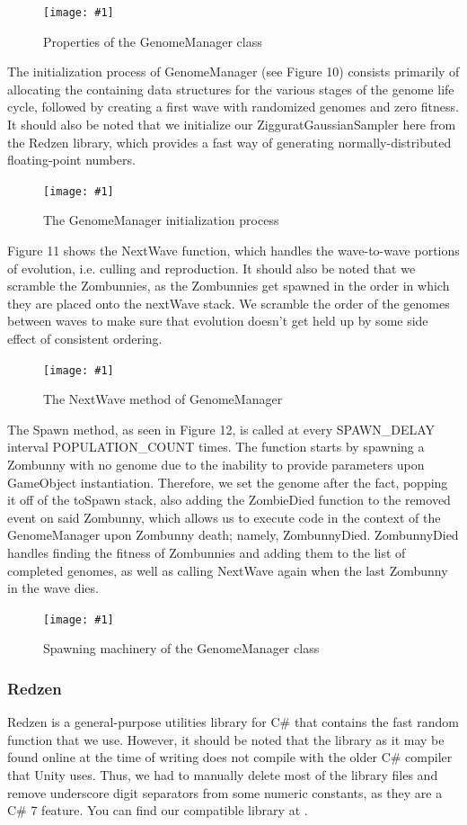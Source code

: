 \documentclass[letterpaper]{article}
\def\imfig#1#2{\begin{figure}[h] \centering \texttt{[image: \#1]} \caption{#2} \end{figure}}
\begin{document}
\imfig{GenomeManagerProperties}{Properties of the GenomeManager class}

The initialization process of GenomeManager (see Figure 10) consists primarily of allocating the containing data structures for the various stages of the genome life cycle, followed by creating a first wave with randomized genomes and zero fitness. It should also be noted that we initialize our ZigguratGaussianSampler here from the Redzen library, which provides a fast way of generating normally-distributed floating-point numbers.

\imfig{GenomeManagerInit}{The GenomeManager initialization process}

Figure 11 shows the NextWave function, which handles the wave-to-wave portions of evolution, i.e. culling and reproduction. It should also be noted that we scramble the Zombunnies, as the Zombunnies get spawned in the order in which they are placed onto the nextWave stack. We scramble the order of the genomes between waves to make sure that evolution doesn't get held up by some side effect of consistent ordering.

\imfig{GenomeManagerNextWave}{The NextWave method of GenomeManager}

The Spawn method, as seen in Figure 12, is called at every SPAWN\_DELAY interval POPULATION\_COUNT times. The function starts by spawning a Zombunny with no genome due to the inability to provide parameters upon GameObject instantiation. Therefore, we set the genome after the fact, popping it off of the toSpawn stack, also adding the ZombieDied function to the removed event on said Zombunny, which allows us to execute code in the context of the GenomeManager upon Zombunny death; namely, ZombunnyDied. ZombunnyDied handles finding the fitness of Zombunnies and adding them to the list of completed genomes, as well as calling NextWave again when the last Zombunny in the wave dies.

\imfig{GenomeManagerSpawn}{Spawning machinery of the GenomeManager class}

\subsubsection{Redzen}

Redzen is a general-purpose utilities library for C\# that contains the fast random function that we use. However, it should be noted that the library as it may be found online at the time of writing does not compile with the older C\# compiler that Unity uses. Thus, we had to manually delete most of the library files and remove underscore digit separators from some numeric constants, as they are a C\# 7 feature. You can find our compatible library at .
\end{document}

